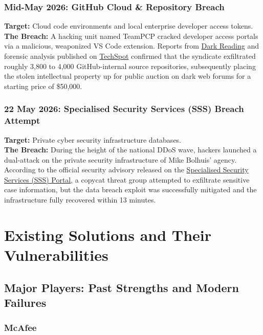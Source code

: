 \documentclass[12pt,letterpaper]{report}
\begin{document}
\subsection{Mid-May 2026: GitHub Cloud \& Repository Breach}
\textbf{Target:} Cloud code environments and local enterprise developer access tokens. \\
\textbf{The Breach:} A hacking unit named TeamPCP cracked developer access portals via a malicious, weaponized VS Code extension. Reports from \href{https://www.darkreading.com/application-security/github-confirms-breach-4k-internal-repos-stolen}{Dark Reading} and forensic analysis published on \href{https://www.techspot.com/news/112498-hackers-breach-github-malicious-vs-code-extension-access.html}{TechSpot} confirmed that the syndicate exfiltrated roughly 3,800 to 4,000 GitHub-internal source repositories, subsequently placing the stolen intellectual property up for public auction on dark web forums for a starting price of \$50,000.

\subsection{22 May 2026: Specialised Security Services (SSS) Breach Attempt}
\textbf{Target:} Private cyber security infrastructure databases. \\
\textbf{The Breach:} During the height of the national DDoS wave, hackers launched a dual-attack on the private security infrastructure of Mike Bolhuis' agency. According to the official security advisory released on the \href{https://www.mikebolhuis.co.za/post/success-project-sss-neutralises-data-breach-recovers-critical-infrastructure-within-13-minutes}{Specialised Security Services (SSS) Portal}, a copycat threat group attempted to exfiltrate sensitive case information, but the data breach exploit was successfully mitigated and the infrastructure fully recovered within 13 minutes.

\chapter{Existing Solutions and Their Vulnerabilities}
\section{Major Players: Past Strengths and Modern Failures}
\subsection{McAfee}
\end{document}
